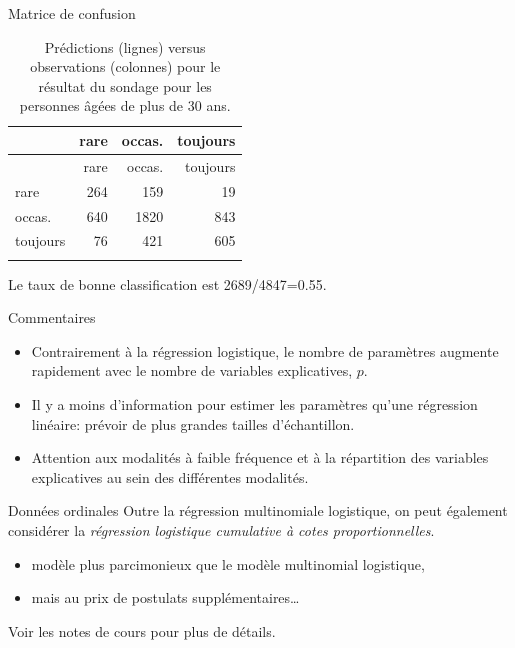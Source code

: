 \documentclass[
  ignorenonframetext,
]{beamer}
\providecommand{\tightlist}{%
  \setlength{\itemsep}{0pt}\setlength{\parskip}{0pt}}\usepackage{longtable,booktabs,array}
\begin{document}
\begin{frame}{Matrice de confusion}
\protect\hypertarget{matrice-de-confusion}{}
\hypertarget{tbl-confusmat}{}
\begin{longtable}[]{@{}lrrr@{}}
\caption{\label{tbl-confusmat}Prédictions (lignes) versus observations
(colonnes) pour le résultat du sondage pour les personnes âgées de plus
de 30 ans.}\tabularnewline
\toprule\noalign{}
& rare & occas. & toujours \\
\midrule\noalign{}
\endfirsthead
\toprule\noalign{}
& rare & occas. & toujours \\
\midrule\noalign{}
\endhead
rare & 264 & 159 & 19 \\
occas. & 640 & 1820 & 843 \\
toujours & 76 & 421 & 605 \\
\bottomrule\noalign{}
\end{longtable}

Le taux de bonne classification est 2689/4847=0.55.
\end{frame}

\begin{frame}{Commentaires}
\protect\hypertarget{commentaires}{}
\begin{itemize}
\tightlist
\item
  Contrairement à la régression logistique, le nombre de paramètres
  augmente rapidement avec le nombre de variables explicatives, \(p\).
\item
  Il y a moins d'information pour estimer les paramètres qu'une
  régression linéaire: prévoir de plus grandes tailles d'échantillon.
\item
  Attention aux modalités à faible fréquence et à la répartition des
  variables explicatives au sein des différentes modalités.
\end{itemize}
\end{frame}

\begin{frame}{Données ordinales}
\protect\hypertarget{donnuxe9es-ordinales}{}
Outre la régression multinomiale logistique, on peut également
considérer la \emph{régression logistique cumulative à cotes
proportionnelles}.

\begin{itemize}
\tightlist
\item
  modèle plus parcimonieux que le modèle multinomial logistique,
\item
  mais au prix de postulats supplémentaires\ldots{}
\end{itemize}

Voir les notes de cours pour plus de détails.
\end{frame}
\end{document}
